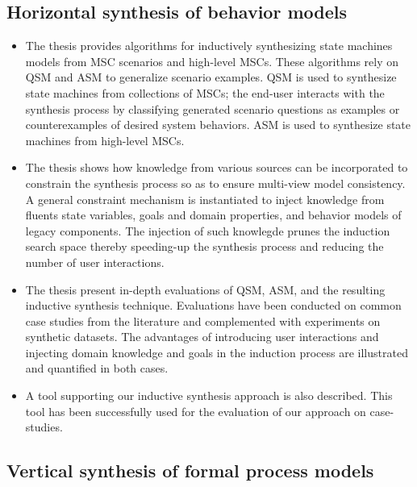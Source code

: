 
\subsection{Horizontal synthesis of behavior models\label{subsection:intro-contrib-inductive-synthesis}}
\begin{itemize}
\item The thesis provides algorithms for inductively synthesizing state machines models from MSC scenarios and high-level MSCs. These algorithms rely on QSM and ASM to generalize scenario examples. QSM is used to synthesize state machines from collections of MSCs; the end-user interacts with the synthesis process by classifying generated scenario questions as examples or counterexamples of desired system behaviors. ASM is used to synthesize state machines from high-level MSCs.
\item The thesis shows how knowledge from various sources can be incorporated to constrain the synthesis process so as to ensure multi-view model consistency. A general constraint mechanism is instantiated to inject knowledge from fluents state variables, goals and domain properties, and behavior models of legacy components. The injection of such knowlegde prunes the induction search space thereby speeding-up the synthesis process and reducing the number of user interactions.
\item The thesis present in-depth evaluations of QSM, ASM, and the resulting inductive synthesis technique. Evaluations have been conducted on common case studies from the literature and complemented with experiments on synthetic datasets. The advantages of introducing user interactions and injecting domain knowledge and goals in the induction process are illustrated and quantified in both cases.
\item A tool supporting our inductive synthesis approach is also described. This tool has been successfully used for the evaluation of our approach on case-studies.
\end{itemize}


\subsection{Vertical synthesis of formal process models\label{subsection:intro-contib-supporting-process-models}}

